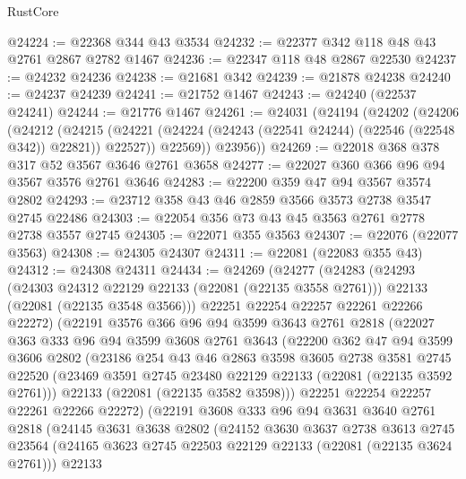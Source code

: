 \begin{lexlean}{RustCore}
\begin{coremodule}
@24224 := @22368 @344 @43 @3534
@24232 := @22377 @342 @118 @48 @43 @2761 @2867 @2782 @1467
@24236 := @22347 @118 @48 @2867 @22530
@24237 := @24232 @24236
@24238 := @21681 @342
@24239 := @21878 @24238
@24240 := @24237 @24239
@24241 := @21752 @1467
@24243 := @24240 (@22537 @24241)
@24244 := @21776 @1467
@24261 := @24031
    (@24194
      (@24202
        (@24206
          (@24212
            (@24215 (@24221 (@24224 (@24243 (@22541 @24244) (@22546 (@22548 @342)) @22821)) @22527))
            @22569))
        @23956))
@24269 := @22018 @368 @378 @317 @52 @3567 @3646 @2761 @3658
@24277 := @22027 @360 @366 @96 @94 @3567 @3576 @2761 @3646
@24283 := @22200 @359 @47 @94 @3567 @3574 @2802
@24293 := @23712 @358 @43 @46 @2859 @3566 @3573 @2738 @3547 @2745 @22486
@24303 := @22054 @356 @73 @43 @45 @3563 @2761 @2778 @2738 @3557 @2745
@24305 := @22071 @355 @3563
@24307 := @22076 (@22077 @3563)
@24308 := @24305 @24307
@24311 := @22081 (@22083 @355 @43)
@24312 := @24308 @24311
@24434 := @24269
    (@24277
      (@24283
        (@24293
          (@24303 @24312 @22129 @22133 (@22081 (@22135 @3558 @2761)))
          @22133
          (@22081 (@22135 @3548 @3566)))
        @22251
        @22254
        @22257
        @22261
        @22266
        @22272)
      (@22191
        @3576
        @366
        @96
        @94
        @3599
        @3643
        @2761
        @2818
        (@22027
          @363
          @333
          @96
          @94
          @3599
          @3608
          @2761
          @3643
          (@22200
            @362
            @47
            @94
            @3599
            @3606
            @2802
            (@23186
              @254
              @43
              @46
              @2863
              @3598
              @3605
              @2738
              @3581
              @2745
              @22520
              (@23469 @3591 @2745 @23480 @22129 @22133 (@22081 (@22135 @3592 @2761)))
              @22133
              (@22081 (@22135 @3582 @3598)))
            @22251
            @22254
            @22257
            @22261
            @22266
            @22272)
          (@22191
            @3608
            @333
            @96
            @94
            @3631
            @3640
            @2761
            @2818
            (@24145
              @3631
              @3638
              @2802
              (@24152
                @3630
                @3637
                @2738
                @3613
                @2745
                @23564
                (@24165 @3623 @2745 @22503 @22129 @22133 (@22081 (@22135 @3624 @2761)))
                @22133

\end{coremodule}
\end{lexlean}
